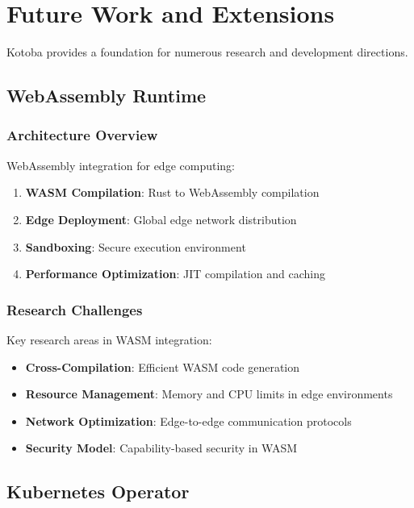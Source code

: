 \documentclass[11pt,a4paper]{article}
\begin{document}
\section{Future Work and Extensions}
\label{sec:future_work}

Kotoba provides a foundation for numerous research and development directions.

\subsection{WebAssembly Runtime}
\label{subsec:wasm_runtime}

\subsubsection{Architecture Overview}
\label{subsubsec:wasm_architecture}

WebAssembly integration for edge computing:

\begin{enumerate}
\item \textbf{WASM Compilation}: Rust to WebAssembly compilation
\item \textbf{Edge Deployment}: Global edge network distribution
\item \textbf{Sandboxing}: Secure execution environment
\item \textbf{Performance Optimization}: JIT compilation and caching
\end{enumerate}

\subsubsection{Research Challenges}
\label{subsubsec:wasm_challenges}

Key research areas in WASM integration:

\begin{itemize}
\item \textbf{Cross-Compilation}: Efficient WASM code generation
\item \textbf{Resource Management}: Memory and CPU limits in edge environments
\item \textbf{Network Optimization}: Edge-to-edge communication protocols
\item \textbf{Security Model}: Capability-based security in WASM
\end{itemize}

\subsection{Kubernetes Operator}
\label{subsec:k8s_operator}
\end{document}
